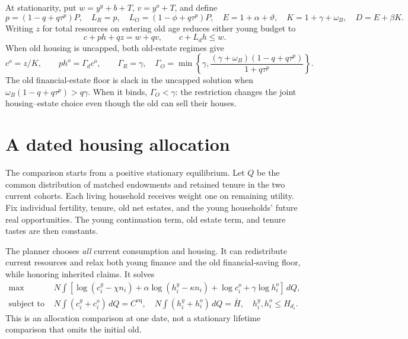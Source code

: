 \documentclass[11pt]{article}
\newcommand{\dd}{\,d}
\newcommand{\eq}{\mathrm{eq}}
\newcommand{\HH}{\bar H}
\newcommand{\tht}{\vartheta}
\begin{document}
At stationarity, put $w=y^y+b+T$, $v=y^o+T$, and define
\[
 p=(1-q+q\tau^p)P,\quad L_R=p,\quad L_O=(1-\phi+q\tau^p)P,
 \quad E=1+\alpha+\tht,\quad K=1+\gamma+\omega_B,\quad D=E+\beta K.
\]
Writing $z$ for total resources on entering old age reduces either young budget to
\begin{equation}
 c+ph+qz=w+qv,\qquad c+L_dh\le w.\label{eq:stationarybudget}
\end{equation}
When old housing is uncapped, both old-estate regimes give
\begin{equation}
 c^o=z/K,\qquad ph^o=\Gamma_dc^o,\qquad
 \Gamma_R=\gamma,\quad
 \Gamma_O=\min\left\{\gamma,
 \frac{(\gamma+\omega_B)(1-q+q\tau^p)}{1+q\tau^p}\right\}.\label{eq:Gamma}
\end{equation}
The old financial-estate floor is slack in the uncapped solution when
$\omega_B(1-q+q\tau^p)>q\gamma$. When it binds, $\Gamma_O<\gamma$: the restriction changes the joint housing--estate choice even though the old can sell their houses.

\section{A dated housing allocation}
The comparison starts from a positive stationary equilibrium. Let $Q$ be the common distribution of matched endowments and retained tenure in the two current cohorts. Each living household receives weight one on remaining utility. Fix individual fertility, tenure, old net estates, and the young households' future real opportunities. The young continuation term, old estate term, and tenure tastes are then constants.

The planner chooses \emph{all} current consumption and housing. It can redistribute current resources and relax both young finance and the old financial-saving floor, while honoring inherited claims. It solves
\begin{equation}
\begin{split}
 \max\quad&N\int[\log(c_i^y-\chi n_i)+\alpha\log(h_i^y-\kappa n_i)
                  +\log c_i^o+\gamma\log h_i^o]\dd Q,\\
 \text{subject to}\quad&N\int(c_i^y+c_i^o)\dd Q=C^{\eq},\quad
 N\int(h_i^y+h_i^o)\dd Q=\HH,\quad h_i^y,h_i^o\le H_{d_i}.
\end{split}\label{eq:plannerF}
\end{equation}
This is an allocation comparison at one date, not a stationary lifetime comparison that omits the initial old.
\end{document}
